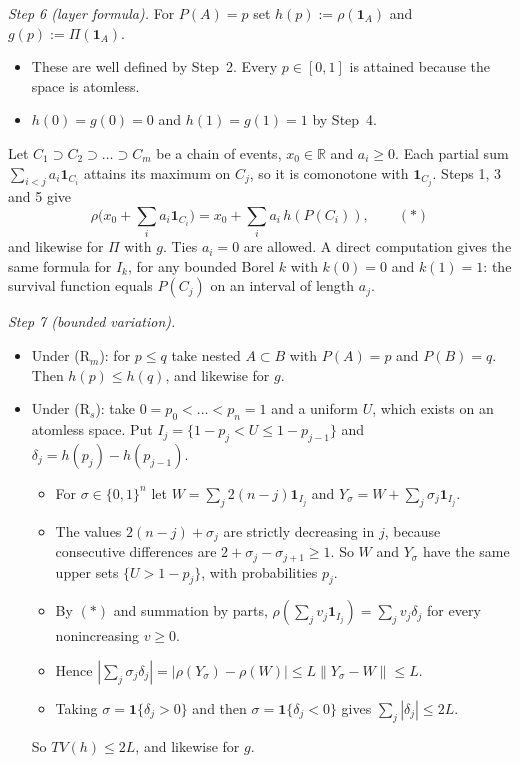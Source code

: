\textit{Step 6 (layer formula).} For $P(A)=p$ set $h(p):=\rho(\mathbf 1_A)$ and $g(p):=\Pi(\mathbf 1_A)$.
\begin{itemize}
\item These are well defined by Step~2. Every $p\in[0,1]$ is attained because the space is atomless.
\item $h(0)=g(0)=0$ and $h(1)=g(1)=1$ by Step~4.
\end{itemize}
Let $C_1\supset C_2\supset\dots\supset C_m$ be a chain of events, $x_0\in\mathbb R$ and $a_i\ge0$. Each partial sum $\sum_{i<j}a_i\mathbf 1_{C_i}$ attains its maximum on $C_j$, so it is comonotone with $\mathbf 1_{C_j}$. Steps 1, 3 and 5 give
\[
\rho\Big(x_0+\sum_i a_i\mathbf 1_{C_i}\Big)=x_0+\sum_i a_i\,h(P(C_i)),\qquad(*)
\]
and likewise for $\Pi$ with $g$. Ties $a_i=0$ are allowed. A direct computation gives the same formula for $I_k$, for any bounded Borel $k$ with $k(0)=0$ and $k(1)=1$: the survival function equals $P(C_j)$ on an interval of length $a_j$.

\textit{Step 7 (bounded variation).}
\begin{itemize}
\item Under (R$_m$): for $p\le q$ take nested $A\subset B$ with $P(A)=p$ and $P(B)=q$. Then $h(p)\le h(q)$, and likewise for $g$.
\item Under (R$_s$): take $0=p_0<\dots<p_n=1$ and a uniform $U$, which exists on an atomless space. Put $I_j=\{1-p_j<U\le1-p_{j-1}\}$ and $\delta_j=h(p_j)-h(p_{j-1})$.
  \begin{itemize}
  \item For $\sigma\in\{0,1\}^n$ let $W=\sum_j2(n-j)\mathbf 1_{I_j}$ and $Y_\sigma=W+\sum_j\sigma_j\mathbf 1_{I_j}$.
  \item The values $2(n-j)+\sigma_j$ are strictly decreasing in $j$, because consecutive differences are $2+\sigma_j-\sigma_{j+1}\ge1$. So $W$ and $Y_\sigma$ have the same upper sets $\{U>1-p_j\}$, with probabilities $p_j$.
  \item By $(*)$ and summation by parts, $\rho(\sum_jv_j\mathbf 1_{I_j})=\sum_jv_j\delta_j$ for every nonincreasing $v\ge0$.
  \item Hence $|\sum_j\sigma_j\delta_j|=|\rho(Y_\sigma)-\rho(W)|\le L\|Y_\sigma-W\|\le L$.
  \item Taking $\sigma=\mathbf 1\{\delta_j>0\}$ and then $\sigma=\mathbf 1\{\delta_j<0\}$ gives $\sum_j|\delta_j|\le2L$.
  \end{itemize}
  So $TV(h)\le2L$, and likewise for $g$.
\end{itemize}

